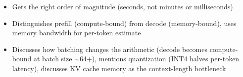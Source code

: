 \begin{interviewq}
\goodgreat
\begin{itemize}
    \item {} Gets the right order of magnitude (seconds, not minutes or milliseconds)
    \item {} Distinguishes prefill (compute-bound) from decode (memory-bound), uses memory bandwidth for per-token estimate
    \item {} Discusses how batching changes the arithmetic (decode becomes compute-bound at batch size $\sim$64+), mentions quantization (INT4 halves per-token latency), discusses KV cache memory as the context-length bottleneck
\end{itemize}

\end{interviewq}

